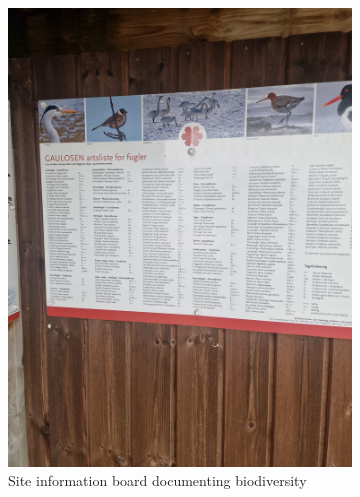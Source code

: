 \documentclass[twocolumn]{article}
\begin{document}
\begin{figure}[h]
\begin{subfigure}{0.31\textwidth}
\includegraphics[width=\textwidth]{02_species_information_board.jpg}
\caption{Site information board documenting biodiversity}
\end{subfigure}
\hfill
\begin{subfigure}{0.31\textwidth}
\centering

\end{subfigure}
\end{figure}
\end{document}
